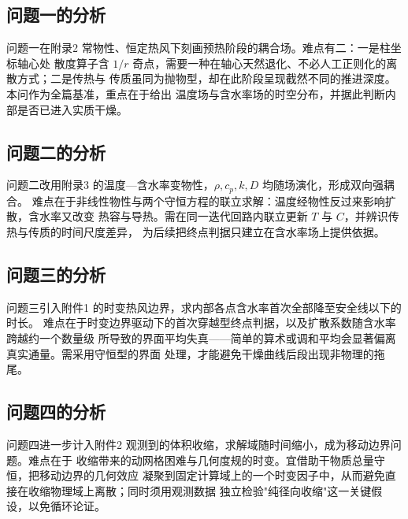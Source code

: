 \subsection{问题一的分析}

问题一在附录2 常物性、恒定热风下刻画预热阶段的耦合场。难点有二：一是柱坐标轴心处
散度算子含 $1/r$ 奇点，需要一种在轴心天然退化、不必人工正则化的离散方式；二是传热与
传质虽同为抛物型，却在此阶段呈现截然不同的推进深度。本问作为全篇基准，重点在于给出
温度场与含水率场的时空分布，并据此判断内部是否已进入实质干燥。

\subsection{问题二的分析}

问题二改用附录3 的温度—含水率变物性，$\rho,c_p,k,D$ 均随场演化，形成双向强耦合。
难点在于非线性物性与两个守恒方程的联立求解：温度经物性反过来影响扩散，含水率又改变
热容与导热。需在同一迭代回路内联立更新 $T$ 与 $C$，并辨识传热与传质的时间尺度差异，
为后续把终点判据只建立在含水率场上提供依据。

\subsection{问题三的分析}

问题三引入附件1 的时变热风边界，求内部各点含水率首次全部降至安全线以下的时长。
难点在于时变边界驱动下的首次穿越型终点判据，以及扩散系数随含水率跨越约一个数量级
所导致的界面平均失真——简单的算术或调和平均会显著偏离真实通量。需采用守恒型的界面
处理，才能避免干燥曲线后段出现非物理的拖尾。

\subsection{问题四的分析}

问题四进一步计入附件2 观测到的体积收缩，求解域随时间缩小，成为移动边界问题。难点在于
收缩带来的动网格困难与几何度规的时变。宜借助干物质总量守恒，把移动边界的几何效应
凝聚到固定计算域上的一个时变因子中，从而避免直接在收缩物理域上离散；同时须用观测数据
独立检验"纯径向收缩"这一关键假设，以免循环论证。
